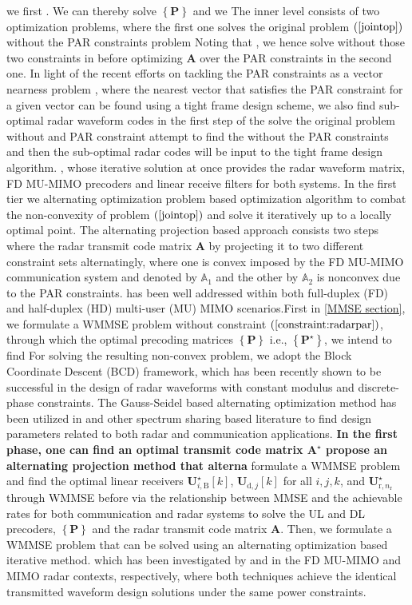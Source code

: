 \documentclass[9pt,journal]{IEEEtran}
\newcommand{\paren}[1]{\left({#1}\right)}
\newcommand{\bracket}[1]{{\left [{#1}\right ]}}
\newcommand{\braces}[1]{{\left\{ {#1}\right\}}}
\newcommand{\B}{\textrm{B}}
\newcommand{\rnr}{_{\mathrm{r},n_\mathrm{r}}}
\newcommand{\UBj}{\mathbf{U}_{\textrm{d},j}\bracket{k}}
\begin{document}
we first . We can thereby solve $\braces{\mathbf{P}}$  and we The inner level consists of two optimization problems, where the first one solves the original problem $\paren{\ref{jointop}}$ without the PAR constraints  problem Noting that , we hence solve  without those two constraints in  before optimizing $\mathbf{A}$ over the PAR constraints in the second one. In light of the recent efforts on tackling the PAR constraints as a vector nearness problem \cite{NaghshTSP2017,nearestvector}, where the nearest vector that satisfies the PAR constraint for a given vector can be found using a tight frame design scheme, we also find sub-optimal radar waveform codes in the first step of the  solve the original problem without and PAR constraint attempt to find the  without the PAR constraints and then the sub-optimal radar codes will be input to the tight frame design algorithm.  , whose iterative solution at once provides the radar waveform matrix, FD MU-MIMO precoders and linear receive filters for both systems. In the first tier we alternating optimization problem  based optimization algorithm to combat the non-convexity of problem $\paren{\mathrm{\ref{jointop}}}$ and solve it iteratively up to a locally optimal point. The alternating projection based approach consists two steps where the radar transmit code matrix $\mathbf{A}$ by projecting it to two different constraint sets alternatingly, where one is convex imposed by the FD MU-MIMO communication system and denoted by $\mathbb{A}_1$ and the other by $\mathbb{A}_2$ is nonconvex due to the PAR constraints. has been well addressed within both full-duplex (FD) and half-duplex (HD) multi-user (MU) MIMO scenarios.First in \ref{MMSE section}, we formulate a WMMSE problem without constraint $\paren{\mathrm{\ref{constraint:radarpar}}}$, through which the optimal precoding matrices $\braces{\mathbf{P}}$ i.e., $\braces{\mathbf{P}^\star}$,  we intend to find 
For solving the resulting non-convex problem, we adopt the Block
Coordinate Descent (BCD) framework, which has been recently
shown to be successful in the design of radar waveforms with constant modulus and discrete-phase constraints. The Gauss-Seidel based alternating optimization method has been utilized in \cite{MCMIMO_RadComm,qian2018joint} and other spectrum sharing based literature to find design parameters related to both radar and communication applications.  \textbf{In the first phase, one can find an optimal transmit code matrix $\mathbf{A}^\star$ propose an alternating projection method that alterna}  formulate a WMMSE problem and find the optimal linear receivers $\mathbf{U}^\star_{i,\B}\bracket{k}$, $\UBj$ for all $i,j,k$, and $\mathbf{U}^\star\rnr$ through WMMSE before  via the relationship between MMSE and the achievable rates for both communication and radar systems to solve the UL and DL precoders, $\braces{\mathbf{P}}$ and the radar transmit code matrix $\mathbf{A}$. Then, we formulate a WMMSE problem that can be solved using an alternating optimization based iterative method. which has been investigated by \cite{FD_WMMSE} and \cite{mutualinformation_mmse} in the FD MU-MIMO and MIMO radar contexts, respectively, where both techniques achieve the identical transmitted waveform design solutions under the same power constraints.  
\fi
\end{document}
